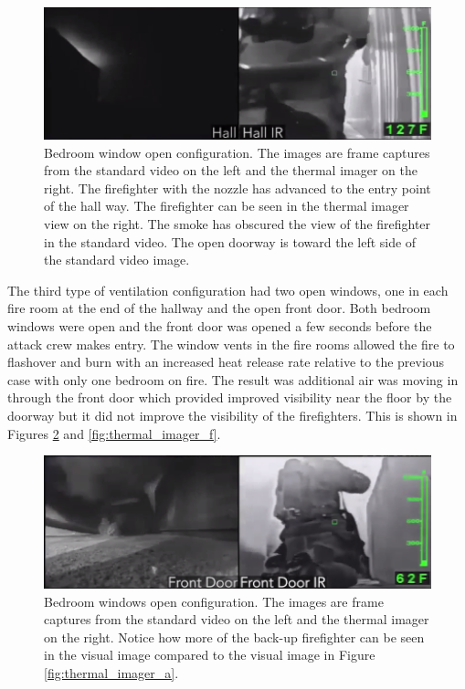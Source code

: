 \documentclass[12pt,oneside]{book}
\begin{document}
\begin{figure}[H]
\centering
\includegraphics[width=1.0\textwidth]{../0_Images/Tactical_Considerations/Thermal_Imager/Exp8Hallpair.png}
\caption[Thermal Imager D]{Bedroom window open configuration. The images are frame captures from the standard video on the left and the thermal imager on the right. The firefighter with the nozzle has advanced to the entry point of the hall way. The firefighter can be seen in the thermal imager view on the right. The smoke has obscured the view of the firefighter in the standard video. The open doorway is toward the left side of the standard video image.}
\label{fig:thermal_imager_d}
\end{figure}

The third type of ventilation configuration had two open windows, one in each fire room at the end of the hallway and the open front door. Both bedroom windows were open and the front door was opened a few seconds before the attack crew makes entry. The window vents in the fire rooms allowed the fire to flashover and burn with an increased heat release rate relative to the previous case with only one bedroom on fire. The result was additional air was moving in through the front door which provided improved visibility near the floor by the doorway but it did not improve the visibility of the firefighters. This is shown in Figures \ref{fig:thermal_imager_e} and \ref{fig:thermal_imager_f}. 

\begin{figure}[H]
\centering
\includegraphics[width=1.0\textwidth]{../0_Images/Tactical_Considerations/Thermal_Imager/Exp14FDpair.png}
\caption[Thermal Imager E]{Bedroom windows open configuration.  The images are frame captures from the standard video on the left and the thermal imager on the right.  Notice how more of the back-up firefighter can be seen in the visual image compared to the visual image in Figure \ref{fig:thermal_imager_a}.}
\label{fig:thermal_imager_e}
\end{figure}
\end{document}
